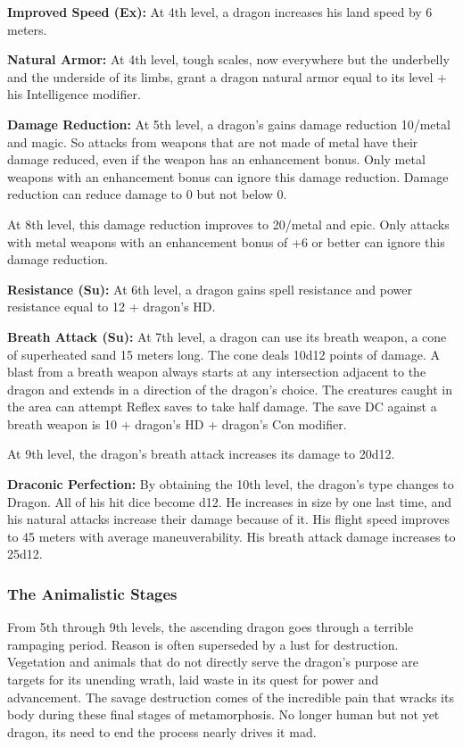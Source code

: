 {\textbf{Improved Speed (Ex):} At 4th level, a dragon increases his land speed by 6 meters.

\textbf{Natural Armor:} At 4th level, tough scales, now everywhere but the underbelly and the underside of its limbs, grant a dragon natural armor equal to its level + his Intelligence modifier.

\textbf{Damage Reduction:} At 5th level, a dragon's gains damage reduction 10/metal and magic. So attacks from weapons that are not made of metal have their damage reduced, even if the weapon has an enhancement bonus. Only metal weapons with an enhancement bonus can ignore this damage reduction. Damage reduction can reduce damage to 0 but not below 0.

At 8th level, this damage reduction improves to 20/metal and epic. Only attacks with metal weapons with an enhancement bonus of +6 or better can ignore this damage reduction.

\textbf{Resistance (Su):} At 6th level, a dragon gains spell resistance and power resistance equal to 12 + dragon's HD.

\textbf{Breath Attack (Su):} At 7th level, a dragon can use its breath weapon, a cone of superheated sand 15 meters long. The cone deals 10d12 points of damage. A blast from a breath weapon always starts at any intersection adjacent to the dragon and extends in a direction of the dragon's choice. The creatures caught in the area can attempt Reflex saves to take half damage. The save DC against a breath weapon is 10 + dragon's HD + dragon's Con modifier.

At 9th level, the dragon's breath attack increases its damage to 20d12.

\textbf{Draconic Perfection:} By obtaining the 10th level, the dragon's type changes to Dragon. All of his hit dice become d12. He increases in size by one last time, and his natural attacks increase their damage because of it. His flight speed improves to 45 meters with average maneuverability. His breath attack damage increases to 25d12.

\subsubsection{The Animalistic Stages}
From 5th through 9th levels, the ascending dragon goes through a terrible rampaging period. Reason is often superseded by a lust for destruction. Vegetation and animals that do not directly serve the dragon's purpose are targets for its unending wrath, laid waste in its quest for power and advancement. The savage destruction comes of the incredible pain that wracks its body during these final stages of metamorphosis. No longer human but not yet dragon, its need to end the process nearly drives it mad.

}

